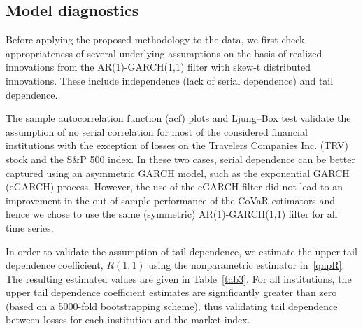 \documentclass[11pt,letterpaper]{article}
\numberwithin{equation}{section}
\begin{document}
\subsection{Model diagnostics}
\label{diag}
Before applying the proposed methodology to the data, we first check appropriateness of several underlying assumptions on the basis of realized innovations from the AR(1)-GARCH(1,1) filter with skew-t distributed innovations. These include independence (lack of serial dependence) and tail dependence. 


The sample autocorrelation function (acf) plots and Ljung–Box test validate the assumption of no serial correlation for most of the considered financial institutions with the exception of losses on the Travelers Companies Inc. (TRV) stock and the S\&P 500 index. In these two cases, serial dependence can be better captured using an asymmetric GARCH model, such as the exponential GARCH (eGARCH) process. However, the use of the eGARCH filter did not lead to an improvement in the out-of-sample performance of the CoVaR estimators and hence we chose to use the same (symmetric) AR(1)-GARCH(1,1) filter for all time series. 


In order to validate the assumption of tail dependence,  we estimate the upper tail dependence coefficient, $R(1,1)$ using the nonparametric estimator in~\eqref{qnpR}. The resulting estimated values are given in Table~\ref{tab3}. For all institutions, the upper tail dependence coefficient estimates are significantly greater than zero (based on a 5000-fold bootstrapping scheme), thus validating tail dependence between losses for each institution and the market index.
\end{document}
